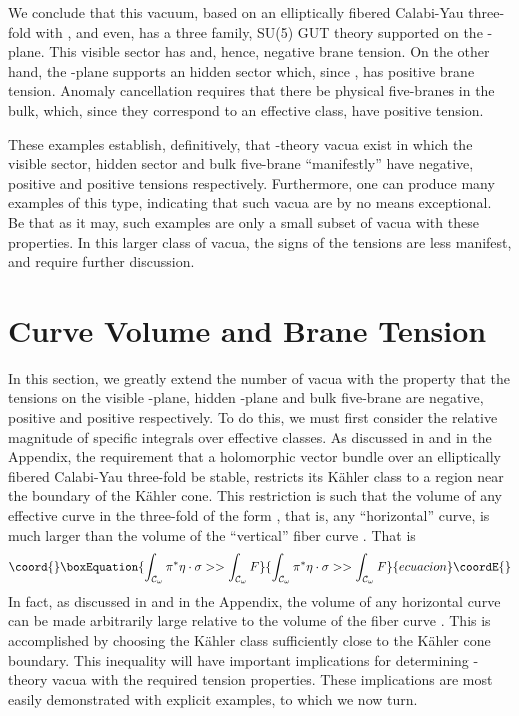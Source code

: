 \documentclass[a4paper,12pt]{article}
\numberwithin{equation}{section}
\theoremstyle{plain}
\begin{document}
We conclude that this vacuum, based on an elliptically fibered Calabi-Yau
three-fold with \coordHE{}, \coordHE{} and even, 
has a three family, SU(5) GUT theory supported on
the \coordHE{}-plane. This visible sector has \coordHE{} and, hence, negative
brane tension. On the other hand, the \coordHE{}-plane supports an \coordHE{} hidden sector
which, since \coordHE{}, has positive brane tension. Anomaly
cancellation requires that there be physical five-branes in the bulk, which,
since they correspond to an effective class, have positive tension.

These examples establish, definitively, that \coordHE{}-theory vacua exist
in which the visible sector, hidden sector and bulk five-brane ``manifestly'' 
have negative, positive and positive tensions respectively. 
Furthermore, one can produce many examples of this type, indicating that such
vacua are by no means exceptional. Be that as it may, such 
examples are only a small subset of vacua with these properties. In this
larger class of vacua, the signs of the tensions are less manifest, and 
require further discussion. 

\section{Curve Volume and Brane Tension}

In this section, we greatly
extend the number of vacua with the property that the tensions on the visible
\coordHE{}-plane, hidden \coordHE{}-plane and bulk five-brane are negative, positive and
positive respectively. To do this, we must first
consider the relative magnitude of specific integrals over effective classes. As
discussed in \cite{RD4} and in the Appendix, the requirement that a 
holomorphic vector bundle over an elliptically fibered Calabi-Yau three-fold be
stable, restricts its K\"{a}hler class to a region near the 
boundary of the K\"{a}hler cone.
This restriction is such that the volume of any effective 
curve in the three-fold of the form \myHighlight{$\pi^{*}\eta\cdot\sigma$}\coordHE{}, that is, 
any ``horizontal'' 
curve, is much larger than the volume of the ``vertical'' fiber
curve \coordHE{}. That is
%
\begin{equation}\coord{}\boxEquation{
\int_{{\cal{C}}_{\omega}}{\pi^{*}\eta\cdot\sigma} >> \int_{{\cal{C}}_{\omega}}{F}
\label{eq:100}
}{
\int_{{\cal{C}}_{\omega}}{\pi^{*}\eta\cdot\sigma} >> \int_{{\cal{C}}_{\omega}}{F}
}{ecuacion}\coordE{}\end{equation}
%
In fact, as discussed in \cite{RD4} and in the Appendix, 
the volume of any horizontal curve can 
be made arbitrarily large relative to the volume of the fiber curve \coordHE{}. This
is accomplished by choosing the K\"{a}hler class sufficiently 
close to the K\"{a}hler 
cone boundary. This inequality will have important implications for determining
\coordHE{}-theory vacua with the required tension properties. These implications are 
most easily demonstrated with explicit examples, to which we now turn.
\end{document}

